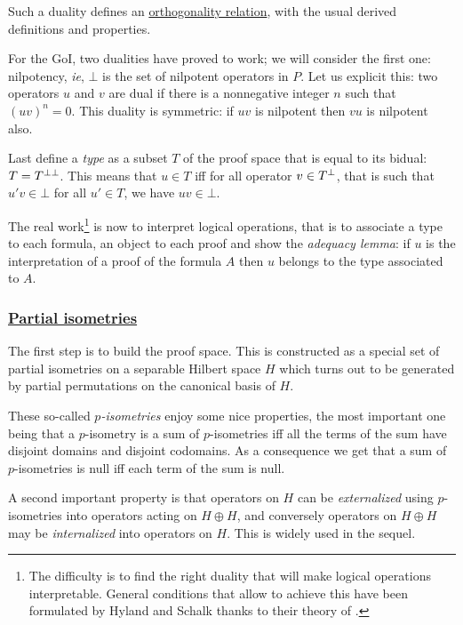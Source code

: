 {Such a duality defines an \hyperref[orthogonality-relation]{orthogonality relation}, with the usual derived definitions and properties.

For the GoI, two dualities have proved to work; we will consider the
first one: nilpotency, \emph{ie}, \(\bot\) is the set of nilpotent
operators in \(P\). Let us explicit this: two operators \(u\) and \(v\)
are dual if there is a nonnegative integer \(n\) such that
\((uv)^n = 0\). This duality is symmetric: if \(uv\) is nilpotent then
\(vu\) is nilpotent also.

Last define a \emph{type} as a subset \(T\) of the proof space that is
equal to its bidual: \(T = T^{\bot\bot}\). This means that \(u\in T\) iff
for all operator \(v\in T^\bot\), that is such that \(u'v\in\bot\) for
all \(u'\in T\), we have \(uv\in\bot\).

The real work\footnote{The difficulty is to find the right duality that
  will make logical operations interpretable. General conditions that
  allow to achieve this have been formulated by Hyland and Schalk
  thanks to their theory of \emph{}.}
is now to interpret logical operations, that is to
associate a type to each formula, an object to each proof and show the
\emph{adequacy lemma}: if \(u\) is the interpretation of a proof of the
formula \(A\) then \(u\) belongs to the type associated to \(A\).

\subsubsection{\texorpdfstring{\hyperref[goi-for-mell-partial-isometries]{Partial isometries}}{Partial isometries}}\label{partial-isometries}

The first step is to build the proof space. This is constructed as a
special set of partial isometries on a separable Hilbert space \(H\)
which turns out to be generated by partial permutations on the canonical
basis of \(H\).

These so-called \emph{\(p\)-isometries} enjoy some nice properties, the
most important one being that a \(p\)-isometry is a sum of
\(p\)-isometries iff all the terms of the sum have disjoint domains and
disjoint codomains. As a consequence we get that a sum of
\(p\)-isometries is null iff each term of the sum is null.

A second important property is that operators on \(H\) can be
\emph{externalized} using \(p\)-isometries into operators acting on
\(H\oplus H\), and conversely operators on \(H\oplus H\) may be
\emph{internalized} into operators on \(H\). This is widely used in the
sequel.

}
